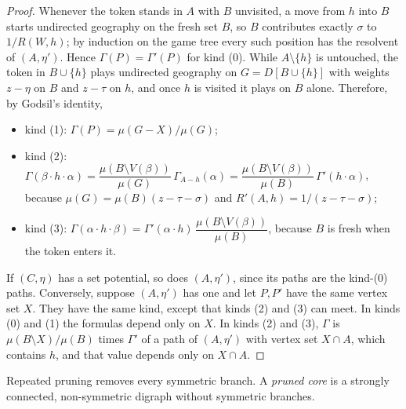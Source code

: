 \documentclass[11pt]{amsart}
\theoremstyle{plain}
\theoremstyle{definition}
\theoremstyle{remark}
\numberwithin{equation}{section}
\begin{document}
\begin{proof}
Whenever the token stands in $A$ with $B$ unvisited, a move from $h$ into $B$ starts undirected geography on the fresh set $B$, so $B$ contributes exactly $\sigma$ to $1/R(W,h)$; by induction on the game tree every such position has the resolvent of $(A,\eta')$. Hence $\Gamma(P)=\Gamma'(P)$ for kind (0). While $A\setminus\{h\}$ is untouched, the token in $B\cup\{h\}$ plays undirected geography on $G=D[B\cup\{h\}]$ with weights $z-\eta$ on $B$ and $z-\tau$ on $h$, and once $h$ is visited it plays on $B$ alone. Therefore, by Godsil's identity,
\begin{itemize}
\item kind (1): $\Gamma(P)=\mu(G-X)/\mu(G)$;
\item kind (2): $\Gamma(\beta\cdot h\cdot\alpha)=\dfrac{\mu(B\setminus V(\beta))}{\mu(G)}\,\Gamma_{A-h}(\alpha)=\dfrac{\mu(B\setminus V(\beta))}{\mu(B)}\,\Gamma'(h\cdot\alpha)$, because $\mu(G)=\mu(B)(z-\tau-\sigma)$ and $R'(A,h)=1/(z-\tau-\sigma)$;
\item kind (3): $\Gamma(\alpha\cdot h\cdot\beta)=\Gamma'(\alpha\cdot h)\,\dfrac{\mu(B\setminus V(\beta))}{\mu(B)}$, because $B$ is fresh when the token enters it.
\end{itemize}
If $(C,\eta)$ has a set potential, so does $(A,\eta')$, since its paths are the kind-(0) paths. Conversely, suppose $(A,\eta')$ has one and let $P,P'$ have the same vertex set $X$. They have the same kind, except that kinds (2) and (3) can meet. In kinds (0) and (1) the formulas depend only on $X$. In kinds (2) and (3), $\Gamma$ is $\mu(B\setminus X)/\mu(B)$ times $\Gamma'$ of a path of $(A,\eta')$ with vertex set $X\cap A$, which contains $h$, and that value depends only on $X\cap A$.
\end{proof}

Repeated pruning removes every symmetric branch. A \emph{pruned core} is a strongly connected, non-symmetric digraph without symmetric branches.
\end{document}
